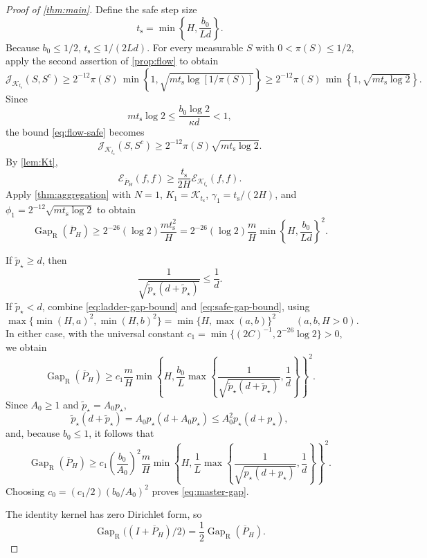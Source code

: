 \documentclass[11pt]{article}
\newcommand{\Gap}{\operatorname{Gap}_{\mathrm{R}}}
\newcommand{\cE}{\mathcal E}
\newcommand{\cK}{\mathcal K}
\newcommand{\1}{\mathbf 1}
\begin{document}
\begin{proof}[Proof of \cref{thm:main}]
		Define the safe step size
		\[
		t_{\mathrm s}=\min\left\{H,\frac{b_0}{Ld}\right\}.
		\]
		Because \(b_0\leq1/2\), $t_{\mathrm s} \leq 1/(2Ld)$.
		For every measurable \(S\) with \(0<\pi(S)\leq1/2\), apply the second assertion of
		\cref{prop:flow} to obtain
		\begin{equation} \label{eq:flow-safe}
			\mathcal{J}_{\cK_{t_{\mathrm s}}}(S,S^c) \geq  2^{-12}  \pi(S) \, \min \left\{ 1, \sqrt{mt_{\mathrm s} \log[1/\pi(S)]}  \right\} \geq  2^{-12}  \pi(S) \, \min \left\{ 1, \sqrt{mt_{\mathrm s} \log 2}  \right\}.
		\end{equation}
		Since
		\[
		m t_{\mathrm s}\log 2
		\leq\frac{b_0\log 2}{\kappa d}<1,
		\]
		the bound \eqref{eq:flow-safe} becomes
		\[
		\mathcal{J}_{\cK_{t_{\mathrm s}}}(S,S^c) \geq  2^{-12} \pi(S)\sqrt{mt_{\mathrm s}\log 2}.
		\]
		By \cref{lem:Kt},
		\[
		\cE_{\overline P_H}(f,f)
		\geq
		\frac{t_{\mathrm s}}{2H}\cE_{\cK_{t_{\mathrm s}}}(f,f).
		\]
		Apply \cref{thm:aggregation} with $N=1$, $K_1=\cK_{t_{\mathrm s}}$,
		$\gamma_1=t_{\mathrm s}/(2H)$, and
		$\phi_1= 2^{-12} \sqrt{mt_{\mathrm s}\log 2}$ to obtain
		\begin{equation}\label{eq:safe-gap-bound}
			\Gap(\overline P_H)
			\geq
			 2^{-26} (\log 2)\frac{m t_{\mathrm s}^{2}}{H}
			= 2^{-26} (\log 2)\frac{m}{H}
			\min\left\{H,\frac{b_0}{Ld}\right\}^2.
		\end{equation}
		
		\bigskip
		
		
		
		
		If $\widetilde p_\star\geq d$, then
		\[
		\frac1{\sqrt{\widetilde p_\star(d+\widetilde p_\star)}}\leq\frac1d.
		\]
		If $\widetilde p_\star<d$,
		combine \eqref{eq:ladder-gap-bound} and \eqref{eq:safe-gap-bound}, using
		\[
		\max\{\min(H,a)^2,\min(H,b)^2\}
		=\min\{H,\max(a,b)\}^{2}
		\qquad(a,b,H>0).
		\]
		In either case, with the universal constant
		$c_1=\min\{(2C)^{-1}, 2^{-26} \log2\}>0$, we obtain
		\[
		\Gap(\overline P_H)
		\geq c_1\frac{m}{H}
		\min\left\{H,\frac{b_0}{L}
		\max\left\{
		\frac1{\sqrt{\widetilde p_\star(d+\widetilde p_\star)}},\frac1d
		\right\}\right\}^{2}.
		\]
		Since $A_0\geq1$ and $\widetilde p_\star=A_0p_\star$,
		\[
		\widetilde p_\star(d+\widetilde p_\star)
		=A_0p_\star(d+A_0p_\star)
		\leq A_0^2p_\star(d+p_\star),
		\]
		and, because $b_0 \leq 1$, it follows that
		\[
		\Gap(\overline P_H)
		\geq c_1\left(\frac{b_0}{A_0}\right)^2\frac{m}{H}
		\min\left\{H,\frac1L\max\left\{
		\frac1{\sqrt{p_\star(d+p_\star)}},\frac1d
		\right\}\right\}^{2}.
		\]
		Choosing
		$c_0=(c_1/2)(b_0/A_0)^2$
		proves \eqref{eq:master-gap}.
		
		The identity kernel has zero Dirichlet form, so
		\[
		\Gap\bigl((I+\overline P_H)/2\bigr)
		=\frac12\Gap(\overline P_H).
		\]
		
	\end{proof}
	
\end{document}
